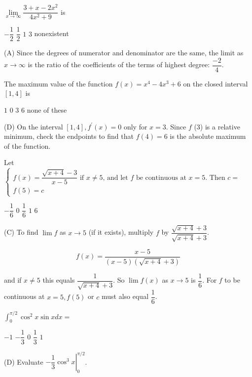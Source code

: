 \question
$\lim\limits_{x \to \infty} \dfrac{3+x-2 x^{2}}{4 x^{2}+9}$ is
\begin{choices}
  \CorrectChoice $-\dfrac{1}{2}$
  \choice $\dfrac{1}{2}$
  \choice $1$
  \choice $3$
  \choice nonexistent
\end{choices}
\begin{solution}
(A) Since the degrees of numerator and denominator are the same, the limit as $x \to \infty$ is the ratio of the coefficients of the terms of highest degree: $\dfrac{-2}{4}$.
\end{solution}



\newpage




\question
The maximum value of the function $f(x)=x^{4}-4 x^{3}+6$ on the closed interval $[1,4]$ is
\begin{choices}
  \choice $1$
  \choice $0$
  \choice $3$
  \CorrectChoice $6$
  \choice none of these
\end{choices}
\begin{solution}
(D) On the interval $[1,4], f^{\prime}(x)=0$ only for $x=3$. Since $f$ (3) is a relative minimum, check the endpoints to find that $f(4)=6$ is the absolute maximum of the function.
\end{solution}

\question
Let $\left\{\begin{array}{l}f(x)=\dfrac{\sqrt{x+4}-3}{x-5} \text { if } x \neq 5 \text {, and let } f \text { be continuous at } x=5 \text {. Then } c= \\ f(5)=c\end{array}\right.$
\begin{choices}
  \choice $-\dfrac{1}{6}$
  \choice $0$
  \CorrectChoice $\dfrac{1}{6}$
  \choice $1$
  \choice $6$
\end{choices}
\begin{solution}
(C) To find $\lim f$ as $x \to 5$ (if it exists), multiply $f$ by $\dfrac{\sqrt{x+4}+3}{\sqrt{x+4}+3}$.

\[
f(x)=\dfrac{x-5}{(x-5)(\sqrt{x+4}+3)}
\]

and if $x \neq 5$ this equals $\dfrac{1}{\sqrt{x+4}+3}$. So $\lim f(x)$ as $x \to 5$ is $\dfrac{1}{6}$. For $f$ to be continuous at $x=5, f(5)$ or $c$ must also equal $\dfrac{1}{6}$.
\end{solution}

\question
$\displaystyle\int_{0}^{\pi / 2} \cos ^{2} x \sin x d x=$
\begin{choices}
  \choice $-1$
  \choice $-\dfrac{1}{3}$
  \choice $0$
  \CorrectChoice $\dfrac{1}{3}$
  \choice $1$
\end{choices}
\begin{solution}
(D) Evaluate $-\left.\dfrac{1}{3} \cos ^{3} x\right|_{0} ^{\pi / 2}$.
\end{solution}




